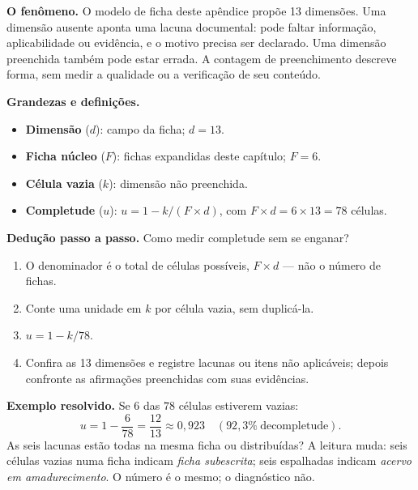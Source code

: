 
\begin{descricao}
\textbf{O fenômeno.} O modelo de ficha deste apêndice propõe 13 dimensões.
Uma dimensão ausente aponta uma lacuna documental: pode faltar informação,
aplicabilidade ou evidência, e o motivo precisa ser declarado. Uma dimensão
preenchida também pode estar errada. A contagem de preenchimento descreve
forma, sem medir a qualidade ou a verificação de seu conteúdo.
\end{descricao}

\begin{definicao}
\textbf{Grandezas e definições.}
\begin{itemize}[leftmargin=1.3em,itemsep=1pt]
  \item \textbf{Dimensão} ($d$): campo da ficha; $d = 13$.
  \item \textbf{Ficha núcleo} ($F$): fichas expandidas deste capítulo; $F = 6$.
  \item \textbf{Célula vazia} ($k$): dimensão não preenchida.
  \item \textbf{Completude} ($u$): $u = 1 - k/(F \times d)$, com $F \times d = 6 \times 13 = 78$ células.
\end{itemize}
\end{definicao}

\begin{metodo}
\textbf{Dedução passo a passo.} Como medir completude sem se enganar?
\begin{enumerate}[leftmargin=1.4em,itemsep=2pt]
  \item O denominador é o total de células possíveis, $F \times d$ --- não o número de fichas.
  \item Conte uma unidade em $k$ por célula vazia, sem duplicá-la.
  \item $u = 1 - k/78$.
  \item Confira as 13 dimensões e registre lacunas ou itens não aplicáveis; depois confronte as afirmações preenchidas com suas evidências.
\end{enumerate}
\end{metodo}

\begin{resultado}
\textbf{Exemplo resolvido.} Se $6$ das $78$ células estiverem vazias:
\[ u = 1 - \frac{6}{78} = \frac{12}{13} \approx 0{,}923 \quad (92{,}3\%\ \mathrm{de completude}). \]
As seis lacunas estão todas na mesma ficha ou distribuídas? A leitura muda: seis
células vazias numa ficha indicam \emph{ficha subescrita}; seis espalhadas indicam
\emph{acervo em amadurecimento}. O número é o mesmo; o diagnóstico não.
\end{resultado}

